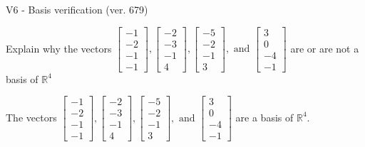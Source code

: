 \begin{exercise}
  \begin{exerciseTitle}V6 - Basis verification (ver. 679)\end{exerciseTitle}
  \begin{exerciseStatement}
    Explain why the vectors \(\left[\begin{array}{r}
-1 \\
-2 \\
-1 \\
-1
\end{array}\right] , \left[\begin{array}{r}
-2 \\
-3 \\
-1 \\
4
\end{array}\right] , \left[\begin{array}{r}
-5 \\
-2 \\
-1 \\
3
\end{array}\right] , \text{ and } \left[\begin{array}{r}
3 \\
0 \\
-4 \\
-1
\end{array}\right]\) are or are not a basis of \(\mathbb{R}^4\)	


  \end{exerciseStatement}
  \begin{exerciseAnswer}
   The vectors \(\left[\begin{array}{r}
-1 \\
-2 \\
-1 \\
-1
\end{array}\right] , \left[\begin{array}{r}
-2 \\
-3 \\
-1 \\
4
\end{array}\right] , \left[\begin{array}{r}
-5 \\
-2 \\
-1 \\
3
\end{array}\right] , \text{ and } \left[\begin{array}{r}
3 \\
0 \\
-4 \\
-1
\end{array}\right]\) 
  	 are  a basis of \(\mathbb{R}^4\).
  


  \end{exerciseAnswer}
\end{exercise}